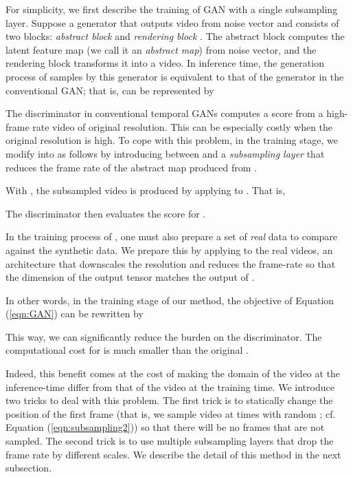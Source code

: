 \documentclass[twocolumn]{svjour3}
\def\Eq#1{Equation (\ref{eqn:#1})}
\begin{document}
For simplicity, we first describe the training of GAN with a single subsampling layer.
Suppose a generator that outputs video  from noise vector  and consists of two blocks: {\em abstract block}  and {\em rendering block} .
The abstract block computes the latent feature map (we call it an {\it abstract map}) from noise vector, and the rendering block transforms it into a video.
In inference time, the generation process of samples by this generator is equivalent to that of
the generator in the conventional GAN; that is,  can be represented by








The discriminator in conventional temporal GANs computes a score from a high-frame rate video of original resolution.
This can be especially costly when the original resolution is high.
To cope with this problem, in the training stage, we modify  into  as follows by introducing between  and  a {\it subsampling layer} 
that reduces the frame rate of the abstract map produced from .

With , the subsampled video  is produced by applying  to  . That is,

The discriminator  then evaluates the score for .





In the training process of , one must also prepare a set of \textit{real} data to compare against the synthetic data.
We prepare this by applying  to the real videos, an architecture that downscales the resolution and reduces the frame-rate so that the dimension of the output tensor matches the output of .

In other words, in the training stage of our method, the objective of \Eq{GAN}
can be rewritten by

This way, we can significantly reduce the burden on the discriminator.
The computational cost for  is much smaller than the original .

Indeed, this benefit comes at the cost of making the domain of the video at the inference-time differ from that of the video at the training time.
We introduce two tricks to deal with this problem.
The first trick is to statically change the position of the first frame (that is, we sample video at times  with random ; cf. \Eq{subsampling2}) so that there will be no frames that are not sampled.
The second trick is to use multiple subsampling layers that drop the frame rate by different scales.
We describe the detail of this method in the next subsection.
\end{document}

